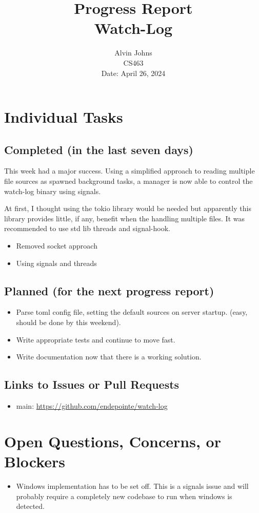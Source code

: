 \documentclass{article}
\title{Progress Report\\[0.5em]
\large Watch-Log}
\author{Alvin Johns\\
CS463\\
Date: April 26, 2024}
\date{}
\begin{document}
\maketitle

\section*{Individual Tasks}
\subsection*{Completed (in the last seven days)}
This week had a major success. Using a simplified approach to reading multiple
file sources as spawned background tasks, a manager is now able to control the
watch-log binary using signals.

At first, I thought using the tokio library would be needed but apparently this
library provides little, if any, benefit when the handling multiple files. It was
recommended to use std lib threads and signal-hook.
\begin{itemize}
    \item Removed socket approach
    \item Using signals and threads
\end{itemize}

\subsection*{Planned (for the next progress report)}
\begin{itemize}
    \item Parse toml config file, setting the default sources on server startup.
        (easy, should be done by this weekend).
    \item Write appropriate tests and continue to move fast.
    \item Write documentation now that there is a working solution.
\end{itemize}

\subsection*{Links to Issues or Pull Requests}
\begin{itemize}
    \item main: \url{https://github.com/endepointe/watch-log}
\end{itemize}

\section*{Open Questions, Concerns, or Blockers}
\begin{itemize}
    \item Windows implementation has to be set off. This is a signals issue and
        will probably require a completely new codebase to run when windows is
        detected. 
\end{itemize}
\end{document}

